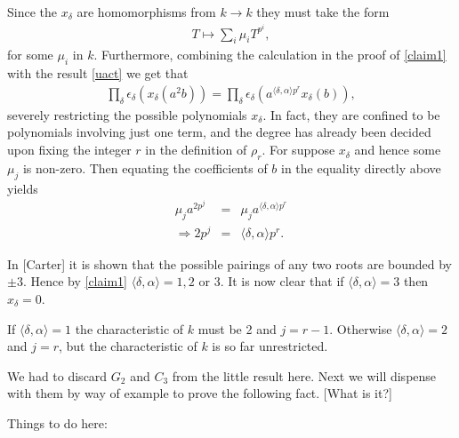 Since the $x_\delta$ are homomorphisms from $k\rightarrow k$ they must take the form
\begin{eqnarray*}
T\mapsto\sum_i \mu_i T^{p^i},
\end{eqnarray*}
for some $\mu_i$ in $k$. Furthermore, combining the calculation in the proof of \ref{claim1} with the result \ref{uact} we get that
\begin{eqnarray*}
\prod_\delta \epsilon_\delta\left(x_\delta\left(a^2b\right)\right) = \prod_\delta \epsilon_\delta\left(a^{\langle \delta, \alpha \rangle p^r}x_\delta\left(b\right)\right),
\end{eqnarray*}
severely restricting the possible polynomials $x_\delta$. In fact, they are confined to be polynomials involving just one term, and the degree has already been decided upon fixing the integer $r$ in the definition of $\rho_r$. For suppose $x_\delta$ and hence some $\mu_j$ is non-zero. Then equating the coefficients of $b$ in the equality directly above yields
\begin{eqnarray*}
\mu_ja^{2p^j} &=& \mu_j a^{\langle \delta, \alpha \rangle p^r}\\
\Longrightarrow2p^j &=& \langle \delta, \alpha \rangle p^r.
\end{eqnarray*}

In [Carter] it is shown that the possible pairings of any two roots are bounded by $\pm 3$. Hence by \ref{claim1} $\langle \delta, \alpha \rangle = 1, 2$ or 3. It is now clear that if $\langle \delta, \alpha \rangle = 3$ then $x_\delta = 0$.

If $\langle \delta, \alpha \rangle = 1$ the characteristic of $k$ must be 2 and $j = r-1$. Otherwise $\langle \delta, \alpha \rangle = 2$ and $j = r$, but the characteristic of $k$ is so far unrestricted.


We had to discard $G_2$ and $C_3$ from the little result here. Next we will dispense with them by way of example to prove the following fact. [What is it?]

Things to do here:

